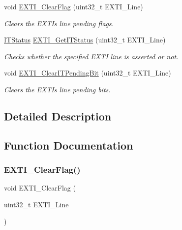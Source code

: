 \begin{DoxyCompactItemize}
void \hyperlink{group___e_x_t_i___private___functions_ga8e07aaaa286dea4803605d5968850a92}{E\+X\+T\+I\+\_\+\+Clear\+Flag} (uint32\+\_\+t E\+X\+T\+I\+\_\+\+Line)
\begin{DoxyCompactList}\small\item\em Clears the E\+X\+TI\textquotesingle{}s line pending flags. \end{DoxyCompactList}\item 
\hyperlink{group___exported__types_gaacbd7ed539db0aacd973a0f6eca34074}{I\+T\+Status} \hyperlink{group___e_x_t_i___private___functions_gaf7b51519062ae42fd27ee689cab364aa}{E\+X\+T\+I\+\_\+\+Get\+I\+T\+Status} (uint32\+\_\+t E\+X\+T\+I\+\_\+\+Line)
\begin{DoxyCompactList}\small\item\em Checks whether the specified E\+X\+TI line is asserted or not. \end{DoxyCompactList}\item 
void \hyperlink{group___e_x_t_i___private___functions_ga3652a7e682728b310c124e7e974d1468}{E\+X\+T\+I\+\_\+\+Clear\+I\+T\+Pending\+Bit} (uint32\+\_\+t E\+X\+T\+I\+\_\+\+Line)
\begin{DoxyCompactList}\small\item\em Clears the E\+X\+TI\textquotesingle{}s line pending bits. \end{DoxyCompactList}\end{DoxyCompactItemize}


\subsection{Detailed Description}


\subsection{Function Documentation}
\mbox{\label{group___e_x_t_i___private___functions_ga8e07aaaa286dea4803605d5968850a92}} 
\subsubsection{\texorpdfstring{E\+X\+T\+I\+\_\+\+Clear\+Flag()}{EXTI\_ClearFlag()}}
{\footnotesize\ttfamily void E\+X\+T\+I\+\_\+\+Clear\+Flag (\begin{DoxyParamCaption}\item[{uint32\+\_\+t}]{E\+X\+T\+I\+\_\+\+Line }\end{DoxyParamCaption})}




